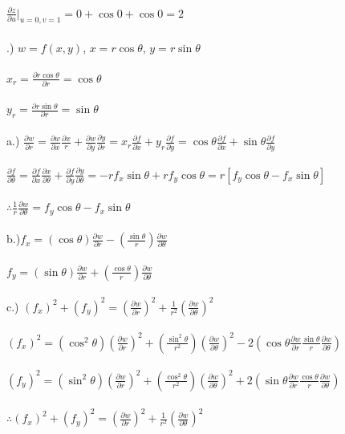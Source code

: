 \documentclass[12pt]{article}
\begin{document}
\noindent $\frac{\partial z}{\partial u} \Big|_{u = 0, v=1} = 0+\cos{0} + \cos{0} = 2$\\\\



.) $w = f(x,y)$, \hspace{10pt} $x = r\cos{\theta}$, \hspace{10pt} $y = r\sin{\theta}$\\\\
\noindent $x_{r} = \frac{\partial r\cos{\theta}}{\partial r} = \cos{\theta}$\\\\
\noindent $y_{r} = \frac{\partial r\sin{\theta}}{\partial r} = \sin{\theta}$\\\\
\noindent a.) $\frac{\partial w}{\partial r} = \frac{\partial w}{\partial x}\frac{\partial x}{r}
 + \frac{\partial w}{\partial y}\frac{\partial y}{\partial r} = x_{r}\frac{\partial f}{\partial x} 
+ y_{r}\frac{\partial f}{\partial y} = \cos{\theta}\frac{\partial f}{\partial x} + \sin{\theta}\frac{\partial f}{\partial y}$
\\\\$\frac{\partial f}{\partial \theta} = \frac{\partial f}{\partial x}\frac{\partial x}{\partial \theta} 
+ \frac{\partial f}{\partial y}\frac{\partial y}{\partial \theta} 
= -rf_{x}\sin{\theta} + rf_{y}\cos{\theta} = r[f_{y}\cos{\theta} - f_{x}\sin{\theta}]$\\\\
\noindent $\therefore \frac{1}{r}\frac{\partial w}{\partial \theta} = f_{y}\cos{\theta} - f_{x}\sin{\theta}$\\\\
\noindent b.)$f_{x} = (\cos{\theta})\frac{\partial w}{\partial r}-(\frac{\sin{\theta}}{r})\frac{\partial w}{\partial \theta}$\\\\
$f_{y} = (\sin{\theta})\frac{\partial w}{\partial r} + (\frac{\cos{\theta}}{r})\frac{\partial w}{\partial \theta}$\\\\

\noindent c.) $(f_{x})^{2} + (f_{y})^{2} = (\frac{\partial w}{\partial r})^{2} +
 \frac{1}{r^{2}}(\frac{\partial w}{\partial \theta})^{2}$\\\\
\noindent $(f_{x})^{2} = (\cos^{2}{\theta})(\frac{\partial w}{\partial r})^{2} +
 (\frac{\sin^{2}{\theta}}{r^{2}})(\frac{\partial w}{\partial \theta})^{2} - 
2(\cos{\theta}\frac{\partial w}{\partial r}\frac{\sin{\theta}}{r}\frac{\partial w}{\partial \theta})$\\\\
\noindent $(f_{y})^{2} = (\sin^{2}{\theta})(\frac{\partial w}{\partial r})^{2} +
 (\frac{\cos^{2}{\theta}}{r^{2}})(\frac{\partial w}{\partial \theta})^{2} + 
2(\sin{\theta}\frac{\partial w}{\partial r}\frac{\cos{\theta}}{r}\frac{\partial w}{\partial \theta})$\\\\
\noindent $\therefore (f_{x})^{2} + (f_{y})^{2} = (\frac{\partial w}{\partial r})^{2} + 
\frac{1}{r^{2}}(\frac{\partial w}{\partial \theta})^{2}$\\\\ 
\end{document}
